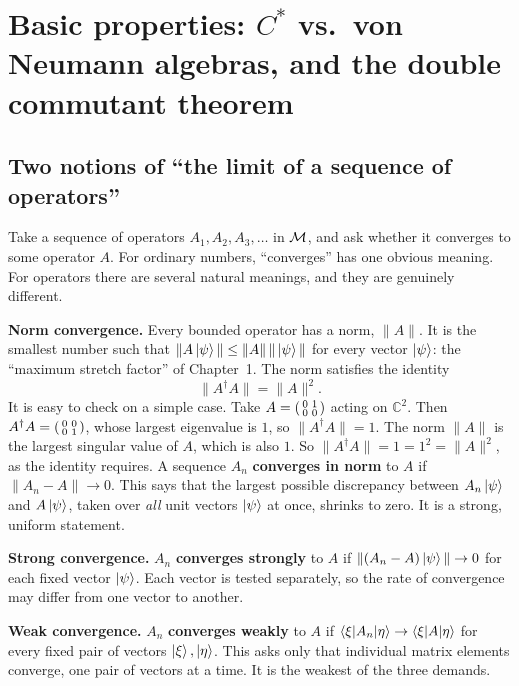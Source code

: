 \section{Basic properties: \texorpdfstring{$C^*$}{C*} vs.\ von Neumann algebras, and the double commutant theorem}

\subsection*{Two notions of ``the limit of a sequence of operators''}

Take a sequence of operators $A_1,A_2,A_3,\dots$ in $\mathcal{M}$, and ask whether it converges to some operator $A$.
For ordinary numbers, ``converges'' has one obvious meaning. For operators there are several natural
meanings, and they are genuinely different.

\textbf{Norm convergence.} Every bounded operator has a norm, $\|A\|$. It is the smallest number such that
$\|A\ket\psi\|\le\|A\|\,\|\ket\psi\|$ for every vector $\ket\psi$: the ``maximum stretch factor'' of
Chapter~1. The norm satisfies the identity
\begin{equation}
\|A^\dagger A\|=\|A\|^2 .
\label{eq:Cstar-identity}
\end{equation}
It is easy to check on a simple case. Take $A=\begin{psmallmatrix}0&1\\0&0\end{psmallmatrix}$ acting on
$\mathbb C^2$. Then $A^\dagger A = \begin{psmallmatrix}0&0\\0&1\end{psmallmatrix}$, whose largest eigenvalue
is $1$, so $\|A^\dagger A\|=1$. The norm $\|A\|$ is the largest singular value of $A$, which is also $1$. So
$\|A^\dagger A\|=1=1^2=\|A\|^2$, as the identity requires. A sequence $A_n$ \textbf{converges in norm} to $A$
if $\|A_n-A\|\to0$. This says that the largest possible discrepancy between $A_n\ket\psi$ and $A\ket\psi$,
taken over \emph{all} unit vectors $\ket\psi$ at once, shrinks to zero. It is a strong, uniform statement.

\textbf{Strong convergence.} $A_n$ \textbf{converges strongly} to $A$ if $\|(A_n-A)\ket\psi\|\to0$ for each
fixed vector $\ket\psi$. Each vector is tested separately, so the rate of convergence may differ from one
vector to another.

\textbf{Weak convergence.} $A_n$ \textbf{converges weakly} to $A$ if $\braket{\xi|A_n|\eta}\to
\braket{\xi|A|\eta}$ for every fixed pair of vectors $\ket\xi,\ket\eta$. This asks only that individual
matrix elements converge, one pair of vectors at a time. It is the weakest of the three demands.

